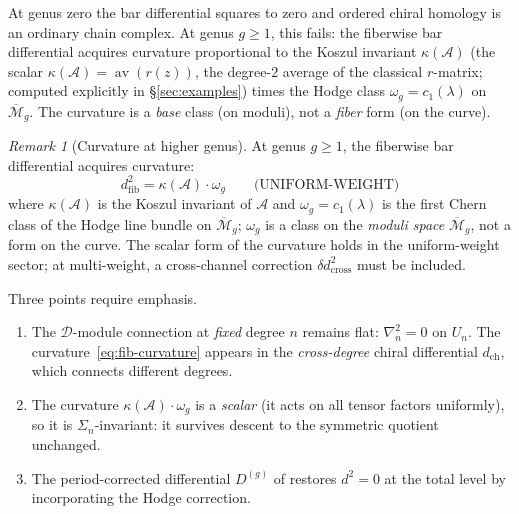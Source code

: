\documentclass[11pt,reqno]{amsart}
\theoremstyle{definition}
\theoremstyle{remark}
\newtheorem{remark}[theorem]{Remark}
\newcommand{\cA}{\mathcal{A}}
\newcommand{\cD}{\mathcal{D}}
\newcommand{\cM}{\mathcal{M}}
\DeclareMathOperator{\av}{av}
\numberwithin{equation}{section}
\begin{document}
At genus zero the bar differential squares to zero and
ordered chiral homology is an ordinary chain complex.
At genus $g \geq 1$, this fails: the fiberwise bar
differential acquires curvature proportional to the Koszul
invariant $\kappa(\cA)$ (the scalar $\kappa(\cA) = \av(r(z))$,
the degree-$2$ average of the classical $r$-matrix; computed
explicitly in \S\ref{sec:examples}) times the Hodge class
$\omega_g = c_1(\lambda)$ on $\overline{\cM}_g$.
The curvature is a \emph{base} class (on moduli),
not a \emph{fiber} form (on the curve).

\begin{remark}[Curvature at higher genus]
\label{rem:higher-genus-curvature}
At genus $g \geq 1$, the fiberwise bar differential acquires
curvature:
\begin{equation}\label{eq:fib-curvature}
  d_{\mathrm{fib}}^2 = \kappa(\cA) \cdot \omega_g
  \qquad\text{(UNIFORM-WEIGHT)}
\end{equation}
where $\kappa(\cA)$ is the Koszul invariant of $\cA$ and
$\omega_g = c_1(\lambda)$ is the first Chern class of the
Hodge line bundle on $\overline{\cM}_g$; $\omega_g$ is a
class on the \emph{moduli space} $\overline{\cM}_g$, not
a form on the curve. The scalar form of the curvature
holds in the uniform-weight sector; at multi-weight,
a cross-channel correction $\delta d^2_{\mathrm{cross}}$
must be included.

Three points require emphasis.
\begin{enumerate}[label=\textup{(\alph*)}]
\item The $\cD$-module connection at \emph{fixed} degree $n$
  remains flat: $\nabla_n^2 = 0$ on $U_n$.
  The curvature~\eqref{eq:fib-curvature} appears in the
  \emph{cross-degree} chiral differential $d_{\mathrm{ch}}$,
  which connects different degrees.
\item The curvature $\kappa(\cA) \cdot \omega_g$ is a
  \emph{scalar} (it acts on all tensor factors uniformly),
  so it is $\Sigma_n$-invariant: it survives descent to
  the symmetric quotient unchanged.
\item The period-corrected differential $D^{(g)}$ of
  \cite[\S II.3]{Lorgat26I} restores $d^2 = 0$ at the
  total level by incorporating the Hodge correction.
\end{enumerate}
\end{remark}

\end{document}
